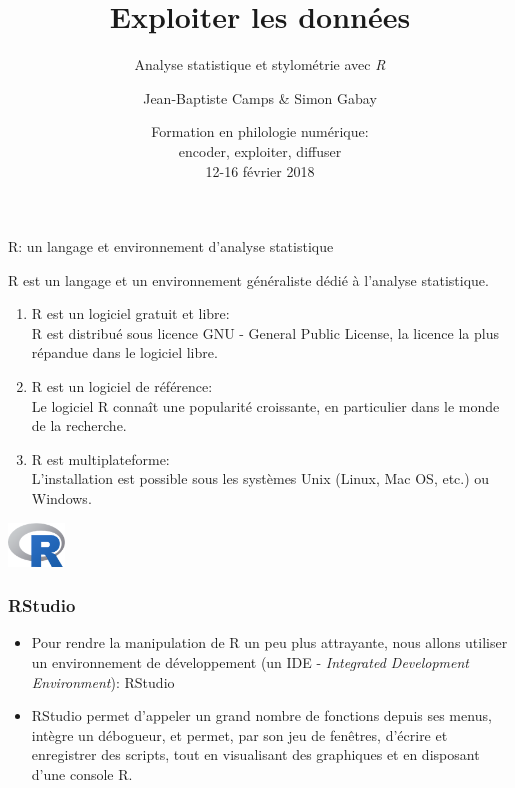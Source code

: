 \documentclass{beamer}
\institute{Univ. de Neuchâtel}
\title{Exploiter les données}
\subtitle{Analyse statistique et stylométrie avec \textit{R}}
\author{Jean-Baptiste Camps \& Simon Gabay}
\date[FoPhil -- 15 févr. 2018]{Formation en philologie numérique:\\ encoder, exploiter, diffuser\\
12-16 février 2018}
\begin{document}
\maketitle
  



\begin{frame}{R: un langage et environnement d'analyse statistique}
	
	\textsc{R} est un langage et un environnement généraliste dédié à l'analyse statistique.
	
	\begin{enumerate}
		\item R est un logiciel gratuit et libre: \\
		R est distribué sous licence GNU - General Public License, la licence la plus répandue dans le logiciel libre.
		
		\item R est un logiciel de référence: \\
		Le logiciel R connaît une popularité croissante, en particulier dans le monde de la recherche. 
		
		\item R est multiplateforme: \\
		L'installation est possible sous les systèmes Unix (Linux, Mac OS, etc.) ou Windows.
		
	\end{enumerate}
	
	
	{\centering \includegraphics[width= 1.5cm]{img/Rlogo.png} }
\end{frame}

\begin{frame}[fragile]
\frametitle{RStudio}

\begin{itemize}
	\item Pour rendre la manipulation de R un peu plus attrayante, nous allons utiliser un environnement de développement (un IDE - \textit{Integrated Development Environment}): \alert{RStudio}
	\item RStudio permet d'appeler un grand nombre de fonctions depuis ses menus, intègre un débogueur, et permet, par son jeu de fenêtres, d'écrire et enregistrer des scripts, tout en visualisant des graphiques et en disposant d'une console R.
\end{itemize}



\end{frame}
\end{document}
